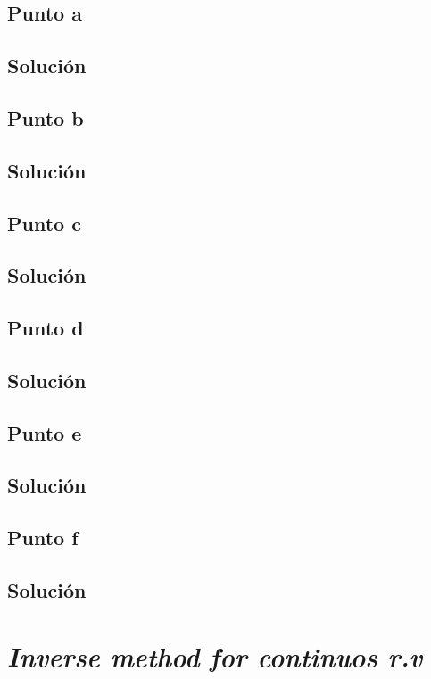 \documentclass[12pt]{article}
\begin{document}
\subsection{Punto a}
\subsection{Solución}

\subsection{Punto b}
\subsection{Solución}

\subsection{Punto c}
\subsection{Solución}

\subsection{Punto d}
\subsection{Solución}

\subsection{Punto e}
\subsection{Solución}

\subsection{Punto f}
\subsection{Solución}


\section{\textit{Inverse method for continuos r.v}}
\end{document}
